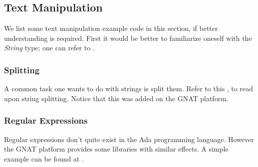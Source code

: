 \subsection{Text Manipulation}
We list some text manipulation example code in this section, if better understanding is required. First it would be better to familiarize oneself with the \textit{String} type; one can refer to \cite{AdaStringType}.

\subsubsection{Splitting}
A common task one wants to do with strings is split them. Refer to this \cite{AdaStringSplit}, to read upon string splitting. Notice that this was added on the GNAT platform.

\subsubsection{Regular Expressions}
Regular expressions don't quite exist in the Ada programming language. However the GNAT platform provides some libraries with similar effects. A simple example can be found at \cite{AdaRegularExpressions}.




